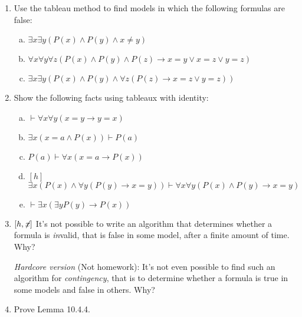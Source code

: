 \begin{enumerate}[\thesection.1]
			\item Use the tableau method to find models in which the following formulas are false:
			
			\begin{enumerate}[(a)]
			
				\item $\exists x\exists y(P(x)\land P(y)\land x\neq y)$
				
				\item $\forall x\forall y\forall z(P(x)\land P(y)\land P(z)\to x=y\lor x=z\lor y=z)$
				
				\item $\exists x\exists y(P(x)\land P(y)\land \forall z(P(z)\to x=z\lor y=z))$
			
			\end{enumerate}

			\item Show the following facts using tableaux with identity:
			
			\begin{enumerate}[(a)]
						
				\item $\vdash \forall x\forall y(x=y\to y=x)$
						
				\item $\exists x(x=a\land P(x))\vdash P(a)$
				
				\item $P(a)\vdash \forall x(x=a\to P(x))$

				\item $[h]$ $\exists x(P(x)\land \forall y(P(y)\to x=y))\vdash \forall x\forall y(P(x)\land P(y)\to x=y)$
				
				\item $\vdash \exists x(\exists yP(y)\to P(x))$
							
			\end{enumerate}
			
			\item $[h, \not\hspace{-.5ex}x]$ It's not possible to write an algorithm that determines whether a formula is \emph{in}valid, that is false in some model, after a finite amount of time. Why? 
			
			\emph{Hardcore version} (Not homework): It's not even possible to find such an algorithm for \emph{contingency}, that is to determine whether a formula is true in some models and false in others. Why?
			
			\item Prove Lemma 10.4.4.
	
	\end{enumerate}



